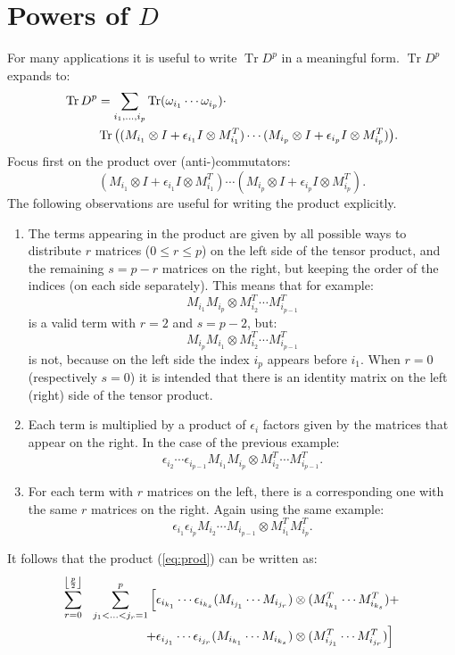 \documentclass[12pt,a4paper]{article}
\DeclareMathOperator{\Tr}{Tr}
\begin{document}
\section{Powers of $D$}
For many applications it is useful to write $\Tr D^p$ in a meaningful form.\newline
$\Tr D^p$ expands to:
\begin{align}\label{eq:trdp}
\Tr D^p &= \sum_{i_1, \ldots, i_p} \Tr (\omega_{i_1} \cdots \omega_{i_p}) \cdot \notag \\
&\Tr \big( (M_{i_1} \otimes I + \epsilon_{i_1} I \otimes M_{i_1}^T) \cdots  (M_{i_p} \otimes I + \epsilon_{i_p} I \otimes M_{i_p}^T) \big).
\end{align}
Focus first on the product over (anti-)commutators:
\begin{equation}\label{eq:prod}
(M_{i_1} \otimes I + \epsilon_{i_1} I \otimes M_{i_1}^T) \cdots  (M_{i_p} \otimes I + \epsilon_{i_p} I \otimes M_{i_p}^T).
\end{equation}
The following observations are useful for writing the product explicitly.
\begin{enumerate}
	\item The terms appearing in the product are given by all possible ways to distribute $r$ matrices ($0 \le r \le p$) on the left side of the tensor product, and the remaining $s = p-r$ matrices on the right, but keeping the order of the indices (on each side separately). This means that for example:
$$ M_{i_1} M_{i_p} \otimes M_{i_2}^T \cdots M_{i_{p-1}}^T $$
is a valid term with $r=2$ and $s=p-2$, but:
$$ M_{i_p} M_{i_1} \otimes M_{i_2}^T \cdots M_{i_{p-1}}^T $$
is not, because on the left side the index $i_p$ appears before $i_1$. When $r=0$ (respectively $s=0$) it is intended that there is an identity matrix on the left (right) side of the tensor product.
	\item Each term is multiplied by a product of $\epsilon_i$ factors given by the matrices that appear on the right. In the case of the previous example:
$$ \epsilon_{i_2} \cdots \epsilon_{i_{p-1}} M_{i_1} M_{i_p} \otimes M_{i_2}^T \cdots M_{i_{p-1}}^T. $$
	\item For each term with $r$ matrices on the left, there is a corresponding one with the same $r$ matrices on the right. Again using the same example:
$$ \epsilon_{i_1} \epsilon_{i_p} M_{i_2} \cdots M_{i_{p-1}} \otimes M_{i_1}^T M_{i_p}^T. $$
\end{enumerate}
It follows that the product (\ref{eq:prod}) can be written as:
\begin{align}\label{eq:prodsum}
\sum_{r=0}^{\left \lfloor \frac{p}{2} \right \rfloor} \ \ \sum_{j_1 < \ldots < j_r = 1}^p \Big[ &\epsilon_{i_{k_1}} \cdots \epsilon_{i_{k_s}} (M_{i_{j_1}} \cdots M_{i_{j_r}}) \otimes ( M_{i_{k_1}}^T \cdots M_{i_{k_s}}^T ) + \notag \\
+ &\epsilon_{i_{j_1}} \cdots \epsilon_{i_{j_r}} ( M_{i_{k_1}} \cdots M_{i_{k_s}} ) \otimes ( M_{i_{j_1}}^T \cdots M_{i_{j_r}}^T ) \Big]
\end{align}
\end{document}
